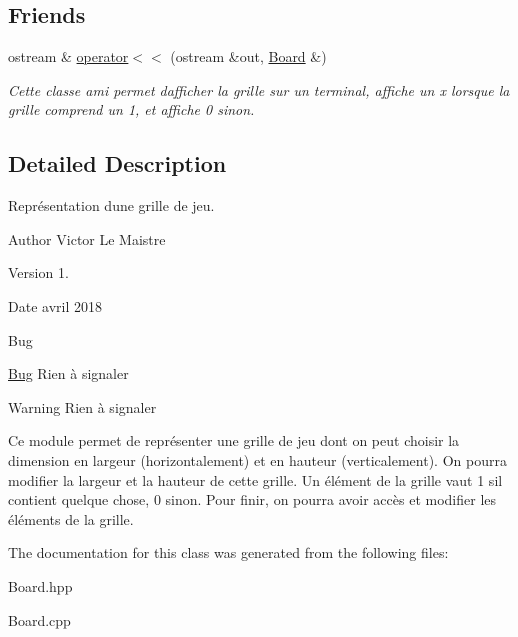 \subsection*{Friends}
\begin{DoxyCompactItemize}
\item 
\mbox{\label{classBoard_aa4c1980eaf4ad187b9af05d10567dae3}} 
ostream \& \hyperlink{classBoard_aa4c1980eaf4ad187b9af05d10567dae3}{operator$<$$<$} (ostream \&out, \hyperlink{classBoard}{Board} \&)
\begin{DoxyCompactList}\small\item\em Cette classe ami permet d\textquotesingle{}afficher la grille sur un terminal, affiche un x lorsque la grille comprend un 1, et affiche 0 sinon. \end{DoxyCompactList}\end{DoxyCompactItemize}


\subsection{Detailed Description}
Représentation d\textquotesingle{}une grille de jeu. 

\begin{DoxyAuthor}{Author}
Victor Le Maistre 
\end{DoxyAuthor}
\begin{DoxyVersion}{Version}
1. 
\end{DoxyVersion}
\begin{DoxyDate}{Date}
avril 2018 
\end{DoxyDate}
\begin{DoxyRefDesc}{Bug}
\item[\hyperlink{bug__bug000002}{Bug}]Rien à signaler \end{DoxyRefDesc}
\begin{DoxyWarning}{Warning}
Rien à signaler
\end{DoxyWarning}
Ce module permet de représenter une grille de jeu dont on peut choisir la dimension en largeur (horizontalement) et en hauteur (verticalement). On pourra modifier la largeur et la hauteur de cette grille. Un élément de la grille vaut 1 s\textquotesingle{}il contient quelque chose, 0 sinon. Pour finir, on pourra avoir accès et modifier les éléments de la grille. 

The documentation for this class was generated from the following files\+:\begin{DoxyCompactItemize}
\item 
Board.\+hpp\item 
Board.\+cpp\end{DoxyCompactItemize}
